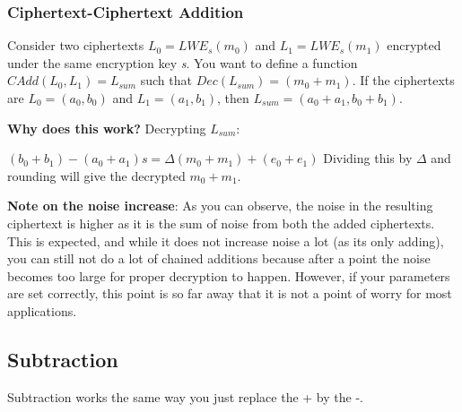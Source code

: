 \documentclass{report}
\begin{document}
\subsubsection{Ciphertext-Ciphertext Addition}
Consider two ciphertexts $L_0 = LWE_s(m_0)$ and $L_1 = LWE_s(m_1)$ encrypted under the same encryption key \textit{s}. You want to define a function $CAdd(L_0, L_1) = L_{sum}$ such that $Dec(L_{sum}) = (m_0 + m_1)$. If the ciphertexts are $L_0 = (a_0, b_0)$ and $L_1 = (a_1, b_1)$, then $L_{sum} = (a_0 + a_1, b_0 + b_1)$. \newline

\textbf{Why does this work?} \newline
Decrypting $L_{sum}$:
\begin{center}
	$(b_0 + b_1) - (a_0 + a_1) s = \Delta(m_0 + m_1) + (e_0 + e_1)$ \newline
	Dividing this by $\Delta$ and rounding will give the decrypted $m_0 + m_1$.
\end{center}
\textbf{Note on the noise increase}: As you can observe, the noise in the resulting ciphertext is higher as it is the sum of noise from both the added ciphertexts. This is expected, and while it does not increase noise a lot (as its only adding), you can still not do a lot of chained additions because after a point the noise becomes too large for proper decryption to happen. However, if your parameters are set correctly, this point is so far away that it is not a point of worry for most applications.

\subsection{Subtraction}
Subtraction works the same way you just replace the + by the -.
\end{document}
